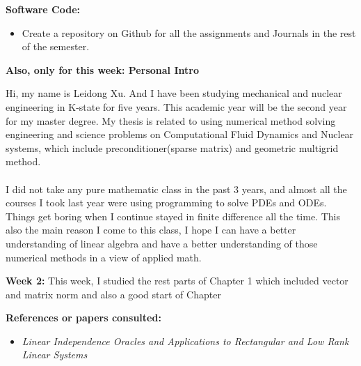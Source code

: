 \documentclass{article}
\begin{document}
\textbf{Software Code:}
 \begin{itemize}
\item Create a repository on Github for all the assignments and Journals in the rest of the semester.
\end{itemize}


\textbf{Also, only for this week: Personal Intro}

Hi, my name is Leidong Xu. And I have been studying mechanical and nuclear engineering in K-state for five years. This academic year will be the second year for my master degree. My thesis is related to using numerical method solving engineering and science problems on Computational Fluid Dynamics and Nuclear systems, which include preconditioner(sparse matrix) and geometric multigrid method.\\ \\ I did not take any pure mathematic class in the past 3 years, and almost all the courses I took last year were using programming to solve PDEs and ODEs. Things get boring when I continue stayed in finite difference all the time. This also the main reason I come to this class, I hope I can have a better understanding of linear algebra and have a better understanding of those numerical methods in a view of applied math.   


\newpage 

\textbf{Week 2:}
This week, I studied the rest parts of Chapter 1 which included vector and matrix norm and also a good start of Chapter


\textbf{References or papers consulted:}
\begin{itemize}

\item {\em Linear Independence Oracles and Applications to Rectangular and Low Rank Linear Systems}

\end{itemize}
\end{document}
